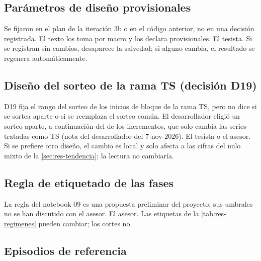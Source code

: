 \subsection{Parámetros de diseño provisionales}
\label{sec:pend-parametros}

{Se fijaron en el plan de la iteración 3b o en el código anterior, no en una decisión registrada.
El texto los toma por macro y los declara provisionales.}
{El tesista.}
{Si se registran sin cambios, desaparece la salvedad; si alguno cambia, el resultado se regenera
automáticamente.}

\subsection{Diseño del sorteo de la rama TS (decisión D19)}
\label{sec:pend-d19}

{D19 fija el rango del sorteo de los inicios de bloque de la rama TS, pero no dice si se sortea
aparte o si se reemplaza el sorteo común. El desarrollador eligió un sorteo aparte, a continuación
del de los incrementos, que solo cambia las series tratadas como TS (nota del desarrollador del
7-nov-2026).}
{El tesista o el asesor.}
{Si se prefiere otro diseño, el cambio es local y solo afecta a las cifras del nulo mixto de la
\cref{sec:res-tendencia}; la lectura no cambiaría.}

\subsection{Regla de etiquetado de las fases}
\label{sec:pend-fases}

{La regla del notebook 09 es una propuesta preliminar del proyecto; sus umbrales no se han
discutido con el asesor.}
{El asesor.}
{Las etiquetas de la \cref{tab:res-regimenes} pueden cambiar; los cortes no.}

\subsection{Episodios de referencia}
\label{sec:pend-episodios}

